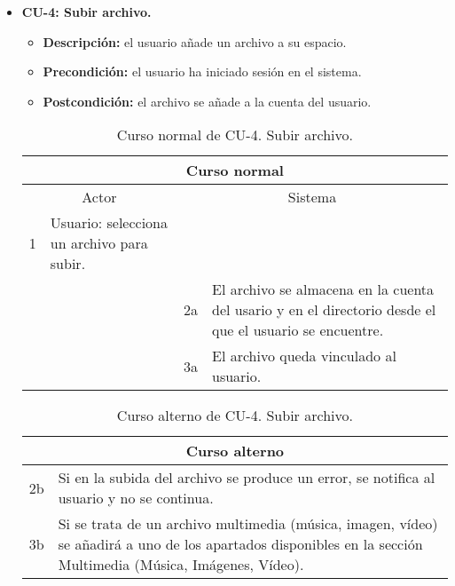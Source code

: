 \begin{itemize}
	\item \textbf{CU-4: Subir archivo.}
	\begin{itemize}
		\item \textbf{Descripción:} el usuario añade un archivo a su espacio.
		\item \textbf{Precondición:} el usuario ha iniciado sesión en el sistema.
		\item \textbf{Postcondición:} el archivo se añade a la cuenta del usuario.
	\end{itemize}
	\begin{table}[H]
		\centering
		\begin{tabular}{|p{0.3cm}|p{5cm}|p{0.3cm}|p{5cm}|}
			\hline
			\multicolumn{4}{|c|}{Curso normal} \\ \hline
			\multicolumn{2}{|c|}{Actor} & \multicolumn{2}{|c|}{Sistema} \\ \hline
			1 & Usuario: selecciona un archivo para subir. &  &  \\ \hline
			&  & 2a & El archivo se almacena en la cuenta del usario y en el directorio desde el que el usuario se encuentre. \\ \hline
			&  & 3a & El archivo queda vinculado al usuario. \\ \hline
		\end{tabular}
		\caption{Curso normal de CU-4. Subir archivo.}
		\label{tabla:cu4-normal}
	\end{table}
	
	\begin{table}[H]
		\centering
		\begin{tabular}{|p{0.3cm}|p{10cm}|}
			\hline
			\multicolumn{2}{|c|}{Curso alterno} \\ \hline
			2b & Si en la subida del archivo se produce un error, se notifica al usuario y no se continua. \\ \hline
			3b & Si se trata de un archivo multimedia (música, imagen, vídeo) se añadirá a uno de los apartados disponibles en la sección Multimedia (Música, Imágenes, Vídeo). \\ \hline
		\end{tabular}
		\caption{Curso alterno de CU-4. Subir archivo.}
		\label{tabla:cu4-alterno}
	\end{table}
\end{itemize}

